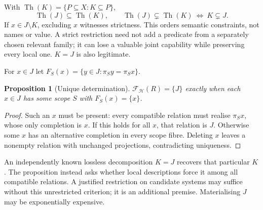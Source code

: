 \documentclass[11pt]{article}
\newtheorem{proposition}[theorem]{Proposition}
\newcommand{\cF}{\mathcal F}
\newcommand{\cH}{\mathcal H}
\newcommand{\Th}{\operatorname{Th}}
\begin{document}
With $\Th(K)=\{P\subseteq X:K\subseteq P\}$,
\begin{equation}\label{eq:theory}
\Th(J)\subseteq\Th(K),\qquad
\Th(J)\subsetneq\Th(K)\ \Longleftrightarrow\ K\subsetneq J.
\end{equation}
If $x\in J\setminus K$, excluding $x$ witnesses strictness. This orders semantic constraints, not names or value. A strict restriction need not add a predicate from a separately chosen relevant family; it can lose a valuable joint capability while preserving every local one. $K=J$ is also legitimate.

\label{eq:fibre}For $x\in J$ let $F_S(x)=\{y\in J:\pi_Sy=\pi_Sx\}$.
\begin{proposition}[Unique determination]\label{prop:unique}
$\cF_{\cH}(R)=\{J\}$ exactly when each $x\in J$ has some scope $S$ with $F_S(x)=\{x\}$.
\end{proposition}
\begin{proof}
Such an $x$ must be present: every compatible relation must realise $\pi_Sx$, whose only completion is $x$. If this holds for all $x$, that relation is $J$. Otherwise some $x$ has an alternative completion in every scope fibre. Deleting $x$ leaves a nonempty relation with unchanged projections, contradicting uniqueness.
\end{proof}
An independently known lossless decomposition $K=J$ recovers that particular $K$. The proposition instead asks whether local descriptions force it among all compatible relations. A justified restriction on candidate systems may suffice without this unrestricted criterion; it is an additional premise. Materialising $J$ may be exponentially expensive.
\end{document}
